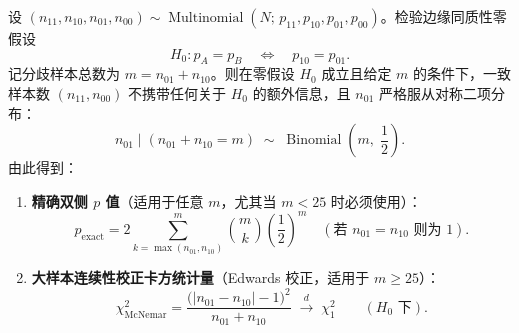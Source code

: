 \begin{thmBox}
\begin{theorem}\label{thm:mcnemar}
设 $(n_{11}, n_{10}, n_{01}, n_{00}) \sim \operatorname{Multinomial}(N;\, p_{11}, p_{10}, p_{01}, p_{00})$。检验边缘同质性零假设
\[
  H_0 : p_A = p_B \quad\Longleftrightarrow\quad p_{10} = p_{01}.
\]
记分歧样本总数为 $m = n_{01} + n_{10}$。则在零假设 $H_0$ 成立且给定 $m$ 的条件下，一致样本数 $(n_{11}, n_{00})$ 不携带任何关于 $H_0$ 的额外信息，且 $n_{01}$ 严格服从对称二项分布：
\begin{equation}\label{eq:mcnemar-binom}
  n_{01} \mid (n_{01} + n_{10} = m) \;\sim\; \operatorname{Binomial}\!\left(m,\; \frac{1}{2}\right).
\end{equation}
由此得到：
\begin{enumerate}
  \item \textbf{精确双侧 $p$ 值}（适用于任意 $m$，尤其当 $m < 25$ 时必须使用）：
  \[
    p_{\text{exact}} = 2 \sum_{k=\max(n_{01}, n_{10})}^{m} \binom{m}{k} \left(\frac{1}{2}\right)^m \quad (\text{若 } n_{01}=n_{10}\text{ 则为 } 1).
  \]
  \item \textbf{大样本连续性校正卡方统计量}（Edwards 校正，适用于 $m \ge 25$）：
  \begin{equation}\label{eq:mcnemar-chi2}
    \chi^2_{\mathrm{McNemar}} = \frac{\big(|n_{01} - n_{10}| - 1\big)^2}{n_{01} + n_{10}} \;\xrightarrow{\,d\,}\; \chi^2_1 \qquad (H_0\text{ 下}).
  \end{equation}
\end{enumerate}
\end{theorem}
\end{thmBox}

